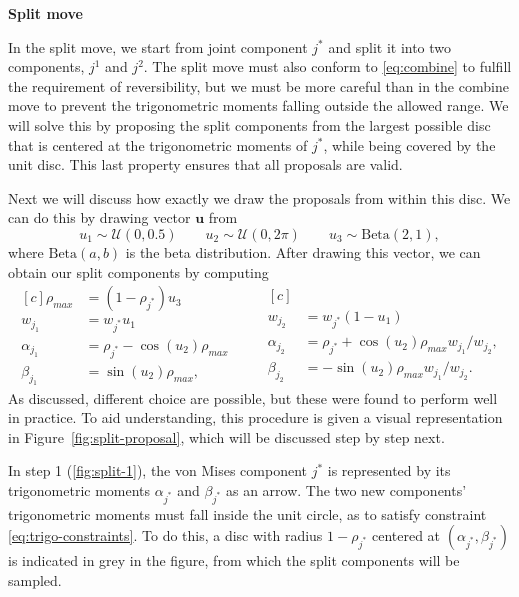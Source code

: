 \vspace{.4cm}

\textbf{Split move}

In the split move, we start from joint component $j^*$ and split it into two components, $j^1$ and $j^2$. The split move must also conform to \eqref{eq:combine} to fulfill the requirement of reversibility, but we must be more careful than in the combine move to prevent the trigonometric moments falling outside the allowed range. We will solve this by proposing the split components from the largest possible disc that is centered at the trigonometric moments of $j^*$, while being covered by the unit disc. This last property ensures that all proposals are valid.

Next we will discuss how exactly we draw the proposals from  within this disc. We can do this by drawing vector $\bm u$ from
\begin{equation}
u_1 \sim \mathcal{U}(0, 0.5) \qquad u_2 \sim \mathcal{U}(0, 2\pi) \qquad u_3 \sim \text{Beta}(2, 1),
\end{equation}
where $\text{Beta}(a, b)$ is the beta distribution. After drawing this vector, we can obtain our split components by computing
\begin{equation}
\label{eq:split-proposal}
\begin{aligned}[c]
\rho_{max} &= (1-\rho_{j^*}) u_3 \\
w_{j_1} &= w_{j^*} u_1 \\
\alpha_{j_1} &= \rho_{j^*} - \cos(u_2) \rho_{max} \\
\beta_{j_1} &= \sin(u_2) \rho_{max},
\end{aligned}
\qquad
\begin{aligned}[c]
\\
w_{j_2} &= w_{j^*} (1-u_1) \\
\alpha_{j_2} &= \rho_{j^*} + \cos(u_2) \rho_{max} w_{j_1} / w_{j_2}, \\
\beta_{j_2} &= -\sin(u_2) \rho_{max} w_{j_1} / w_{j_2}.
\end{aligned}
\end{equation}
As discussed, different choice are possible, but these were found to perform well in practice. To aid understanding, this procedure is given a visual representation in Figure~\ref{fig:split-proposal}, which will be discussed step by step next.

In step 1 (\ref{fig:split-1}), the  von Mises component $j^*$ is represented by its trigonometric moments $\alpha_{j^*}$ and $\beta_{j^*}$ as an arrow. The two new components' trigonometric moments must fall inside the unit circle, as to satisfy constraint \eqref{eq:trigo-constraints}. To do this, a disc with radius $1 - \rho_{j^*}$ centered at $(\alpha_{j^*}, \beta_{j^*})$ is indicated in grey in the figure, from which the split components will be sampled. %

